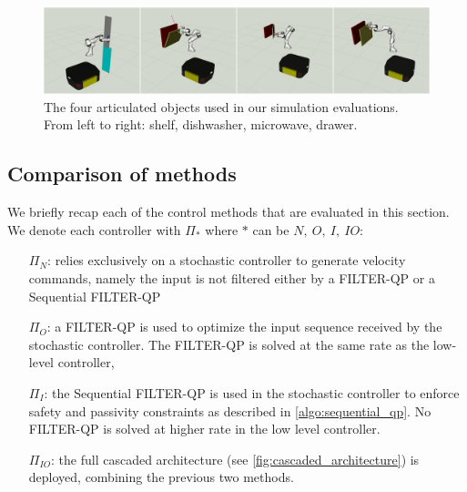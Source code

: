 \begin{figure}[t]
\centering
  \includegraphics[width=\columnwidth]{framework_manipulation/figures/mosaics/articulated_objects_sim.pdf}
  \caption{The four articulated objects used in our simulation evaluations. From left to right: shelf, dishwasher, microwave, drawer.} \label{fig:object_manipulation}
\end{figure}




\subsection{Comparison of methods}
We briefly recap each of the control methods that are evaluated in this section. We denote each controller with $\Pi_{*}$ where $*$ can be $N,\ O,\ I,\ IO$:
\begin{itemize}
    \item[$\Pi_{N}$:] relies exclusively on a stochastic controller to generate velocity commands, namely the input is not filtered either by a FILTER-QP or a Sequential FILTER-QP
    \item[$\Pi_{O}$:] a FILTER-QP is used to optimize the input sequence received by the stochastic controller. The FILTER-QP is solved at the same rate as the low-level controller,
    \item[$\Pi_{I}$:] the Sequential FILTER-QP is used in the stochastic controller to enforce safety and passivity constraints  as described in \algo \ref{algo:sequential_qp}. No FILTER-QP is solved at higher rate in the low level controller.
    \item[$\Pi_{IO}$:] the full cascaded architecture (see \fig \ref{fig:cascaded_architecture}) is deployed, combining the previous two methods.
\end{itemize}

